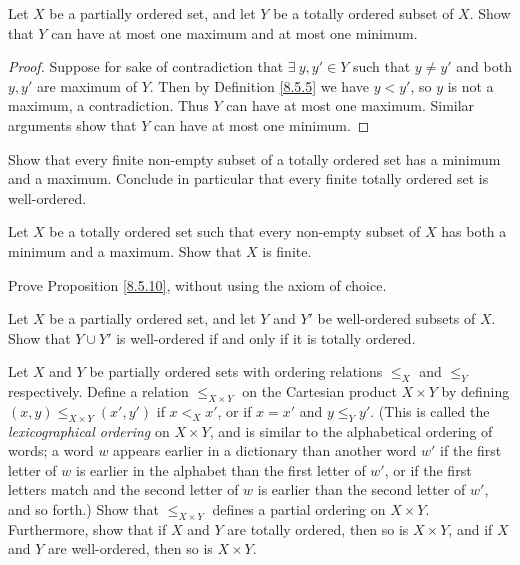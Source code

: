 \begin{exercise}\label{ex 8.5.7}
    Let \(X\) be a partially ordered set, and let \(Y\) be a totally ordered subset of \(X\).
    Show that \(Y\) can have at most one maximum and at most one minimum.
\end{exercise}

\begin{proof}
    Suppose for sake of contradiction that \(\exists\ y, y' \in Y\) such that \(y \neq y'\) and both \(y, y'\) are maximum of \(Y\).
    Then by Definition \ref{8.5.5} we have \(y < y'\), so \(y\) is not a maximum, a contradiction.
    Thus \(Y\) can have at most one maximum.
    Similar arguments show that \(Y\) can have at most one minimum.
\end{proof}

\begin{exercise}\label{ex 8.5.8}
    Show that every finite non-empty subset of a totally ordered set has a minimum and a maximum.
    Conclude in particular that every finite totally ordered set is well-ordered.
\end{exercise}

\begin{exercise}\label{ex 8.5.9}
    Let \(X\) be a totally ordered set such that every non-empty subset of \(X\) has both a minimum and a maximum.
    Show that \(X\) is finite.
\end{exercise}

\begin{exercise}\label{ex 8.5.10}
    Prove Proposition \ref{8.5.10}, without using the axiom of choice.
\end{exercise}

\begin{exercise}\label{ex 8.5.11}
    Let \(X\) be a partially ordered set, and let \(Y\) and \(Y'\) be well-ordered subsets of \(X\).
    Show that \(Y \cup Y'\) is well-ordered if and only if it is totally ordered.
\end{exercise}

\begin{exercise}\label{ex 8.5.12}
    Let \(X\) and \(Y\) be partially ordered sets with ordering relations \(\leq_X\) and \(\leq_Y\) respectively.
    Define a relation \(\leq_{X \times Y}\) on the Cartesian product \(X \times Y\) by defining \((x, y) \leq_{X \times Y} (x', y')\) if \(x <_X x'\), or if \(x = x'\) and \(y \leq_Y y'\).
    (This is called the \emph{lexicographical ordering} on \(X \times Y\), and is similar to the alphabetical ordering of words;
    a word \(w\) appears earlier in a dictionary than another word \(w'\) if the first letter of \(w\) is earlier in the alphabet than the first letter of \(w'\), or if the first letters match and the second letter of \(w\) is earlier than the second letter of \(w'\), and so forth.)
    Show that \(\leq_{X \times Y}\) defines a partial ordering on \(X \times Y\).
    Furthermore, show that if \(X\) and \(Y\) are totally ordered, then so is \(X \times Y\), and if \(X\) and \(Y\) are well-ordered, then so is \(X \times Y\).
\end{exercise}

